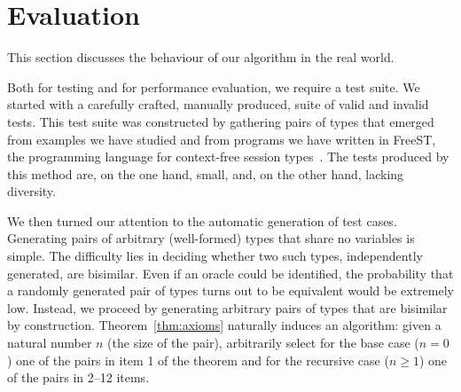 \section{Evaluation}
\label{sec:evaluation}

This section discusses the behaviour of our algorithm in the real
world.

Both for testing and for performance evaluation, we require a test
suite. We started with a carefully crafted, manually produced, suite
of valid and invalid tests. This test suite was constructed by
gathering pairs of types that emerged from examples we have studied
and from programs we have written in FreeST, the programming language
for context-free session
types~\cite{almeida.etal_freest-functional-language}.
The tests produced by this method are, on the one hand, small, and, on
the other hand, lacking diversity.

We then turned our attention to the automatic generation of test
cases. Generating pairs of arbitrary (well-formed) types that share no
variables is simple. The difficulty lies in deciding whether two such
types, independently generated, are bisimilar. Even if an oracle could
be identified, the probability that a randomly generated pair of types
turns out to be equivalent would be extremely low. Instead, we proceed
by generating arbitrary pairs of types that are bisimilar by
construction. Theorem~\ref{thm:axioms} naturally induces an algorithm:
given a natural number $n$ (the size of the pair), arbitrarily select
for the base case ($n=0$) one of the pairs in item 1 of the theorem
and for the recursive case ($n\ge1$) one of the pairs in 2--12 items.

